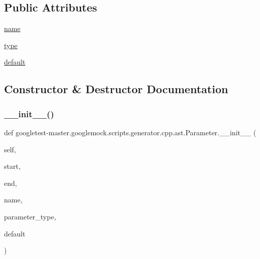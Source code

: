 \subsection*{Public Attributes}
\begin{DoxyCompactItemize}
\item 
\mbox{\hyperlink{classgoogletest-master_1_1googlemock_1_1scripts_1_1generator_1_1cpp_1_1ast_1_1_parameter_a4e76546ea0517958e0785aaa82e614b1}{name}}
\item 
\mbox{\hyperlink{classgoogletest-master_1_1googlemock_1_1scripts_1_1generator_1_1cpp_1_1ast_1_1_parameter_a8ca6ecacbb32782e16160db72ed33f86}{type}}
\item 
\mbox{\hyperlink{classgoogletest-master_1_1googlemock_1_1scripts_1_1generator_1_1cpp_1_1ast_1_1_parameter_af87cdd262b0b943556024df7cc655b74}{default}}
\end{DoxyCompactItemize}


\subsection{Constructor \& Destructor Documentation}
\mbox{\label{classgoogletest-master_1_1googlemock_1_1scripts_1_1generator_1_1cpp_1_1ast_1_1_parameter_aa1d5265408bf9ea562bf1656e99f00a2}} 
\subsubsection{\texorpdfstring{\_\_init\_\_()}{\_\_init\_\_()}}
{\footnotesize\ttfamily def googletest-\/master.\+googlemock.\+scripts.\+generator.\+cpp.\+ast.\+Parameter.\+\_\+\+\_\+init\+\_\+\+\_\+ (\begin{DoxyParamCaption}\item[{}]{self,  }\item[{}]{start,  }\item[{}]{end,  }\item[{}]{name,  }\item[{}]{parameter\+\_\+type,  }\item[{}]{default }\end{DoxyParamCaption})}



